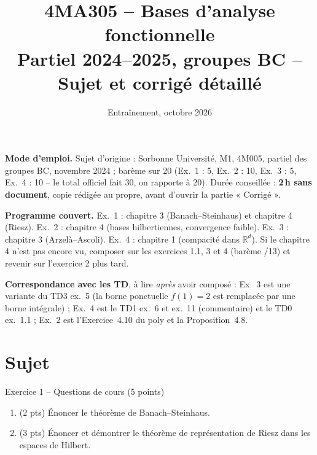 \documentclass[11pt,a4paper]{article}
\title{\textbf{4MA305 -- Bases d'analyse fonctionnelle}\\[2mm]
\Large Partiel 2024--2025, groupes BC -- Sujet et corrigé détaillé}
\author{}
\date{Entraînement, octobre 2026}
\newcommand{\R}{\mathbb{R}}
\theoremstyle{definition}
\begin{document}
\maketitle

\begin{commentaire}
\textbf{Mode d'emploi.} Sujet d'origine : Sorbonne Université, M1, 4M005, partiel des groupes BC, novembre 2024 ; barème sur 20 (Ex.~1 : 5, Ex.~2 : 10, Ex.~3 : 5, Ex.~4 : 10 -- le total officiel fait 30, on rapporte à 20). Durée conseillée : \textbf{2\,h sans document}, copie rédigée au propre, avant d'ouvrir la partie « Corrigé ».

\textbf{Programme couvert.} Ex.~1 : chapitre 3 (Banach--Steinhaus) et chapitre 4 (Riesz). Ex.~2 : chapitre 4 (bases hilbertiennes, convergence faible). Ex.~3 : chapitre 3 (Arzelà--Ascoli). Ex.~4 : chapitre 1 (compacité dans $\R^d$). Si le chapitre 4 n'est pas encore vu, composer sur les exercices 1.1, 3 et 4 (barème /13) et revenir sur l'exercice 2 plus tard.

\textbf{Correspondance avec les TD}, à lire \emph{après} avoir composé : Ex.~3 est une variante du TD3 ex.~5 (la borne ponctuelle $f(1)=2$ est remplacée par une borne intégrale) ; Ex.~4 est le TD1 ex.~6 et ex.~11 (commentaire) et le TD0 ex.~1.1 ; Ex.~2 est l'Exercice~4.10 du poly et la Proposition~4.8.
\end{commentaire}

\section*{Sujet}

\begin{exo}{Exercice 1 -- Questions de cours (5 points)}
\begin{enumerate}[label=\arabic*.]
  \item (2 pts) Énoncer le théorème de Banach--Steinhaus.
  \item (3 pts) Énoncer et démontrer le théorème de représentation de Riesz dans les espaces de Hilbert.
\end{enumerate}
\end{exo}
\end{document}

